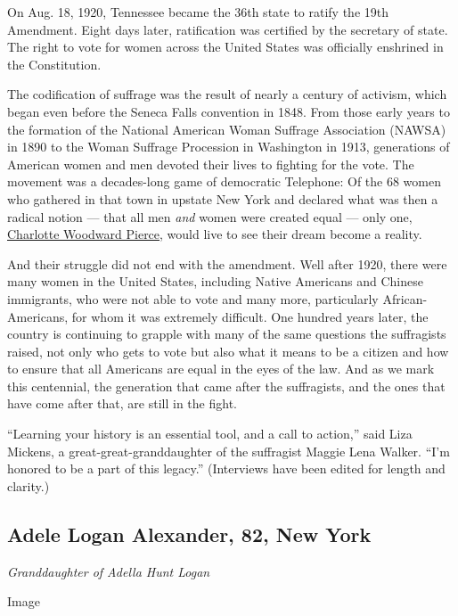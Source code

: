 On Aug. 18, 1920, Tennessee became the 36th state to ratify the 19th
Amendment. Eight days later, ratification was certified by the secretary
of state. The right to vote for women across the United States was
officially enshrined in the Constitution.

The codification of suffrage was the result of nearly a century of
activism, which began even before the Seneca Falls convention in 1848.
From those early years to the formation of the National American Woman
Suffrage Association (NAWSA) in 1890 to the Woman Suffrage Procession in
Washington in 1913, generations of American women and men devoted their
lives to fighting for the vote. The movement was a decades-long game of
democratic Telephone: Of the 68 women who gathered in that town in
upstate New York and declared what was then a radical notion --- that
all men \emph{and} women were created equal --- only one,
\href{https://www.smithsonianmag.com/smart-news/only-one-woman-who-was-seneca-falls-lived-see-women-win-vote-180964044/}{Charlotte
Woodward Pierce}, would live to see their dream become a reality.

And their struggle did not end with the amendment. Well after 1920,
there were many women in the United States, including Native Americans
and Chinese immigrants, who were not able to vote and many more,
particularly African-Americans, for whom it was extremely difficult. One
hundred years later, the country is continuing to grapple with many of
the same questions the suffragists raised, not only who gets to vote but
also what it means to be a citizen and how to ensure that all Americans
are equal in the eyes of the law. And as we mark this centennial, the
generation that came after the suffragists, and the ones that have come
after that, are still in the fight.

``Learning your history is an essential tool, and a call to action,''
said Liza Mickens, a great-great-granddaughter of the suffragist Maggie
Lena Walker. ``I'm honored to be a part of this legacy.'' (Interviews
have been edited for length and clarity.)

\hypertarget{adele-logan-alexander-82-new-york}{%
\subsection{Adele Logan Alexander, 82, New
York}\label{adele-logan-alexander-82-new-york}}

\emph{Granddaughter of Adella Hunt Logan}

Image

